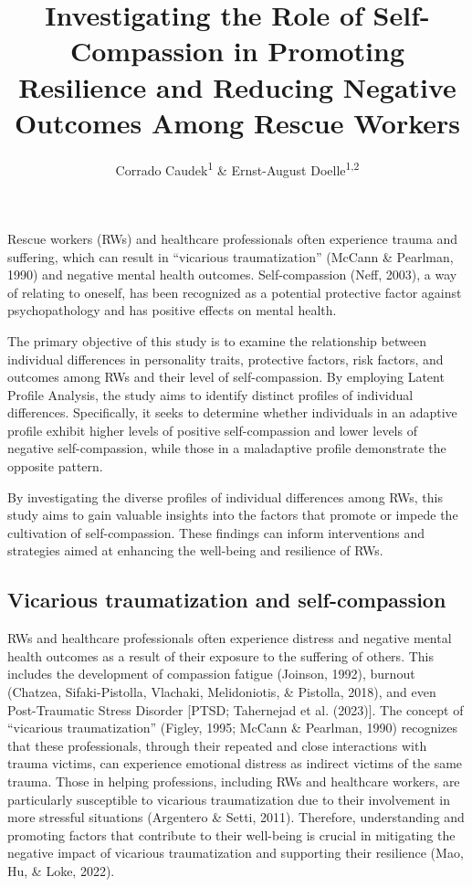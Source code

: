 \documentclass[
  man]{apa6}
\title{Investigating the Role of Self-Compassion in Promoting Resilience and Reducing Negative Outcomes Among Rescue Workers}
\author{Corrado Caudek\textsuperscript{1} \& Ernst-August Doelle\textsuperscript{1,2}}
\date{}
\affiliation{\vspace{0.5cm}\textsuperscript{1} Wilhelm-Wundt-University\\\textsuperscript{2} Konstanz Business School}
\begin{document}
\maketitle

Rescue workers (RWs) and healthcare professionals often experience trauma and suffering, which can result in ``vicarious traumatization'' (McCann \& Pearlman, 1990) and negative mental health outcomes. Self-compassion (Neff, 2003), a way of relating to oneself, has been recognized as a potential protective factor against psychopathology and has positive effects on mental health.

The primary objective of this study is to examine the relationship between individual differences in personality traits, protective factors, risk factors, and outcomes among RWs and their level of self-compassion. By employing Latent Profile Analysis, the study aims to identify distinct profiles of individual differences. Specifically, it seeks to determine whether individuals in an adaptive profile exhibit higher levels of positive self-compassion and lower levels of negative self-compassion, while those in a maladaptive profile demonstrate the opposite pattern.

By investigating the diverse profiles of individual differences among RWs, this study aims to gain valuable insights into the factors that promote or impede the cultivation of self-compassion. These findings can inform interventions and strategies aimed at enhancing the well-being and resilience of RWs.

\hypertarget{vicarious-traumatization-and-self-compassion}{%
\subsection{Vicarious traumatization and self-compassion}\label{vicarious-traumatization-and-self-compassion}}

RWs and healthcare professionals often experience distress and negative mental health outcomes as a result of their exposure to the suffering of others. This includes the development of compassion fatigue (Joinson, 1992), burnout (Chatzea, Sifaki-Pistolla, Vlachaki, Melidoniotis, \& Pistolla, 2018), and even Post-Traumatic Stress Disorder {[}PTSD; Tahernejad et al. (2023){]}. The concept of ``vicarious traumatization'' (Figley, 1995; McCann \& Pearlman, 1990) recognizes that these professionals, through their repeated and close interactions with trauma victims, can experience emotional distress as indirect victims of the same trauma. Those in helping professions, including RWs and healthcare workers, are particularly susceptible to vicarious traumatization due to their involvement in more stressful situations (Argentero \& Setti, 2011). Therefore, understanding and promoting factors that contribute to their well-being is crucial in mitigating the negative impact of vicarious traumatization and supporting their resilience (Mao, Hu, \& Loke, 2022).
\end{document}
